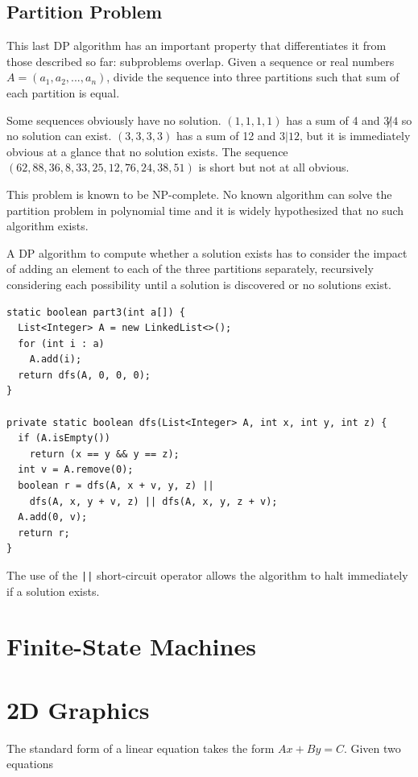 \documentclass{book}
\begin{document}
\section{Partition Problem}

This last DP algorithm has an important property that differentiates it from those described so far: subproblems overlap. Given a sequence or real numbers $A = (a_1, a_2, ... , a_n)$, divide the sequence into three partitions such that sum of each partition is equal.

Some sequences obviously have no solution. $(1,1,1,1)$ has a sum of 4 and $3 \not | 4$ so no solution can exist. $(3,3,3,3)$ has a sum of 12 and $3 | 12$, but it is immediately obvious at a glance that no solution exists. The sequence $(62,88,36,8,33,25,12,76,24,38,51)$ is short but not at all obvious.

This problem is known to be NP-complete. No known algorithm can solve the partition problem in polynomial time and it is widely hypothesized that no such algorithm exists.

A DP algorithm to compute whether a solution exists has to consider the impact of adding an element to each of the three partitions separately, recursively considering each possibility until a solution is discovered or no solutions exist.

\begin{lstlisting}
static boolean part3(int a[]) {
  List<Integer> A = new LinkedList<>();
  for (int i : a)
    A.add(i);
  return dfs(A, 0, 0, 0);
}

private static boolean dfs(List<Integer> A, int x, int y, int z) {
  if (A.isEmpty())
    return (x == y && y == z);
  int v = A.remove(0);
  boolean r = dfs(A, x + v, y, z) ||
    dfs(A, x, y + v, z) || dfs(A, x, y, z + v);
  A.add(0, v);
  return r;
}
\end{lstlisting}

The use of the \texttt{||} short-circuit operator allows the algorithm to halt immediately if a solution exists.

\chapter{Finite-State Machines}

\chapter{2D Graphics}

The standard form of a linear equation takes the form $Ax+By=C$. Given two equations
\end{document}
